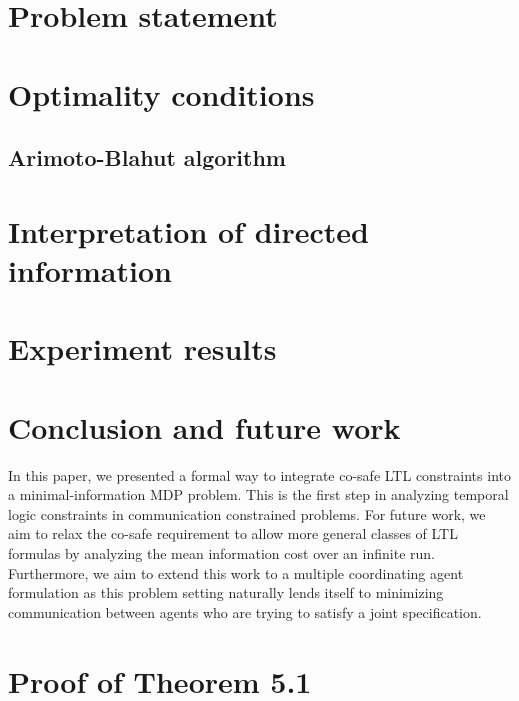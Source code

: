 \documentclass[letterpaper, 10 pt, conference]{ieeeconf}  %
\begin{document}





\section{Problem statement}





\section{Optimality conditions}



\subsection{Arimoto-Blahut algorithm}


\section{Interpretation of directed information}\label{sec:ab}



\section{Experiment results}\label{sec:exp}


\section{Conclusion and future work}
In this paper, we presented a formal way to integrate co-safe LTL constraints into a minimal-information MDP problem. This is the first step in analyzing temporal logic constraints in communication constrained problems. For future work, we aim to relax the co-safe requirement to allow more general classes of LTL formulas by analyzing the mean information cost over an infinite run. Furthermore, we aim to extend this work to a multiple coordinating agent formulation as this problem setting naturally lends itself to minimizing communication between agents who are trying to satisfy a joint specification. 






\appendices
\vspace{-0.15cm}
\section{Proof of Theorem 5.1} \label{sec:prf}

\end{document}
